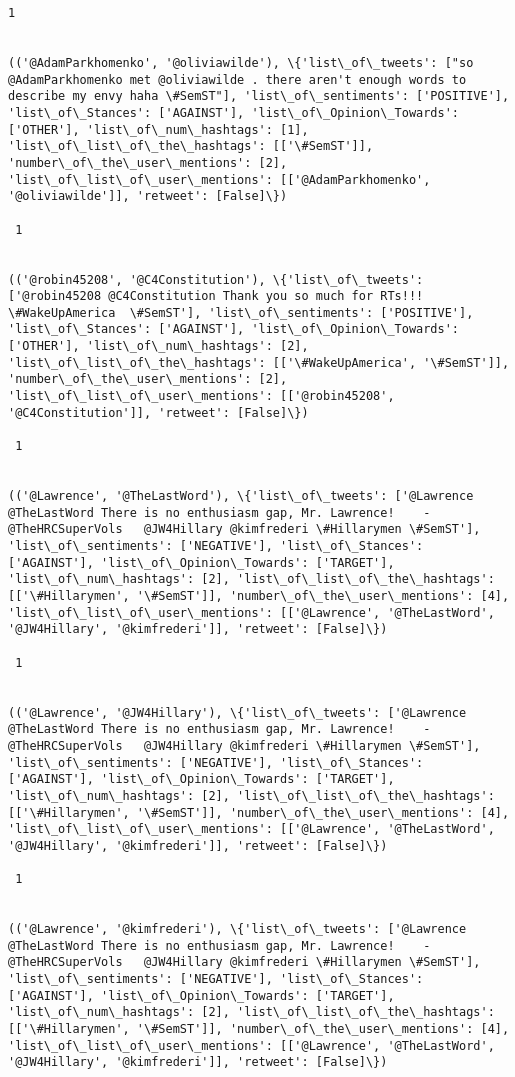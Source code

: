 \documentclass[11pt]{article}
\begin{document}
\begin{Verbatim}[commandchars=\\\{\}]
 1
 

(('@AdamParkhomenko', '@oliviawilde'), \{'list\_of\_tweets': ["so @AdamParkhomenko met @oliviawilde . there aren't enough words to describe my envy haha \#SemST"], 'list\_of\_sentiments': ['POSITIVE'], 'list\_of\_Stances': ['AGAINST'], 'list\_of\_Opinion\_Towards': ['OTHER'], 'list\_of\_num\_hashtags': [1], 'list\_of\_list\_of\_the\_hashtags': [['\#SemST']], 'number\_of\_the\_user\_mentions': [2], 'list\_of\_list\_of\_user\_mentions': [['@AdamParkhomenko', '@oliviawilde']], 'retweet': [False]\})

 1
 

(('@robin45208', '@C4Constitution'), \{'list\_of\_tweets': ['@robin45208 @C4Constitution Thank you so much for RTs!!! \#WakeUpAmerica  \#SemST'], 'list\_of\_sentiments': ['POSITIVE'], 'list\_of\_Stances': ['AGAINST'], 'list\_of\_Opinion\_Towards': ['OTHER'], 'list\_of\_num\_hashtags': [2], 'list\_of\_list\_of\_the\_hashtags': [['\#WakeUpAmerica', '\#SemST']], 'number\_of\_the\_user\_mentions': [2], 'list\_of\_list\_of\_user\_mentions': [['@robin45208', '@C4Constitution']], 'retweet': [False]\})

 1
 

(('@Lawrence', '@TheLastWord'), \{'list\_of\_tweets': ['@Lawrence @TheLastWord There is no enthusiasm gap, Mr. Lawrence!    -@TheHRCSuperVols   @JW4Hillary @kimfrederi \#Hillarymen \#SemST'], 'list\_of\_sentiments': ['NEGATIVE'], 'list\_of\_Stances': ['AGAINST'], 'list\_of\_Opinion\_Towards': ['TARGET'], 'list\_of\_num\_hashtags': [2], 'list\_of\_list\_of\_the\_hashtags': [['\#Hillarymen', '\#SemST']], 'number\_of\_the\_user\_mentions': [4], 'list\_of\_list\_of\_user\_mentions': [['@Lawrence', '@TheLastWord', '@JW4Hillary', '@kimfrederi']], 'retweet': [False]\})

 1
 

(('@Lawrence', '@JW4Hillary'), \{'list\_of\_tweets': ['@Lawrence @TheLastWord There is no enthusiasm gap, Mr. Lawrence!    -@TheHRCSuperVols   @JW4Hillary @kimfrederi \#Hillarymen \#SemST'], 'list\_of\_sentiments': ['NEGATIVE'], 'list\_of\_Stances': ['AGAINST'], 'list\_of\_Opinion\_Towards': ['TARGET'], 'list\_of\_num\_hashtags': [2], 'list\_of\_list\_of\_the\_hashtags': [['\#Hillarymen', '\#SemST']], 'number\_of\_the\_user\_mentions': [4], 'list\_of\_list\_of\_user\_mentions': [['@Lawrence', '@TheLastWord', '@JW4Hillary', '@kimfrederi']], 'retweet': [False]\})

 1
 

(('@Lawrence', '@kimfrederi'), \{'list\_of\_tweets': ['@Lawrence @TheLastWord There is no enthusiasm gap, Mr. Lawrence!    -@TheHRCSuperVols   @JW4Hillary @kimfrederi \#Hillarymen \#SemST'], 'list\_of\_sentiments': ['NEGATIVE'], 'list\_of\_Stances': ['AGAINST'], 'list\_of\_Opinion\_Towards': ['TARGET'], 'list\_of\_num\_hashtags': [2], 'list\_of\_list\_of\_the\_hashtags': [['\#Hillarymen', '\#SemST']], 'number\_of\_the\_user\_mentions': [4], 'list\_of\_list\_of\_user\_mentions': [['@Lawrence', '@TheLastWord', '@JW4Hillary', '@kimfrederi']], 'retweet': [False]\})


\end{Verbatim}
\end{document}
